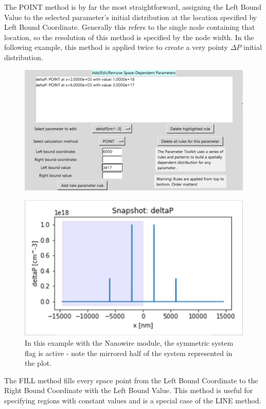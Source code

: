 \documentclass[11pt,letterpaper,titlepage]{article}
\begin{document}
		\par The POINT method is by far the most straightforward, assigning the Left Bound Value to the selected parameter’s initial distribution at the location specified by Left Bound Coordinate. Generally this refers to the single node containing that location, so the resolution of this method is specified by the node width. In the following example, this method is applied twice to create a very pointy $\Delta P$ initial distribution.
		
		\begin{figure}[H]
			\label{fig:ptoolkit_point}
			\centering
			\includegraphics[scale=1]{"ptoolkit_point"}
		\end{figure}
		\begin{figure}[H]
			\label{fig:ptoolkit_point_plot}
			\centering
			\includegraphics[scale=1]{"ptoolkit_point_plot"}
			\caption{In this example with the Nanowire module, the symmetric system flag is active - note the mirrored half of the system represented in the plot.}
		\end{figure}
	
		\par The FILL method fills every space point from the Left Bound Coordinate to the Right Bound Coordinate with the Left Bound Value. This method is useful for specifying regions with constant values and is a special case of the LINE method.
		
\end{document}
